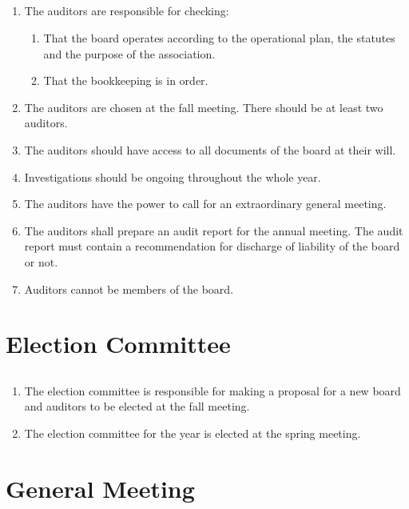 \subsection{}
\begin{enumerate}
  \item The auditors are responsible for checking: 
  \begin{enumerate}
    \item That the board operates according to the operational plan, the statutes and the purpose of the association.
    \item That the bookkeeping is in order.
  \end{enumerate}
  \item The auditors are chosen at the fall meeting. There should be at least two auditors. 
  \item The auditors should have access to all documents of the board at their will.
  \item Investigations should be ongoing throughout the whole year.
  \item The auditors have the power to call for an extraordinary general meeting.
  \item The auditors shall prepare an audit report for the annual meeting. The audit report must contain a recommendation for discharge of liability of the board or not.
  \item Auditors cannot be members of the board. 
\end{enumerate}

\section*{Election Committee}
\subsection{}
\begin{enumerate}
  \item The election committee is responsible for making a proposal for a new board and auditors to be elected at the fall meeting.
  \item The election committee for the year is elected at the spring meeting.
\end{enumerate}

\section*{General Meeting}

